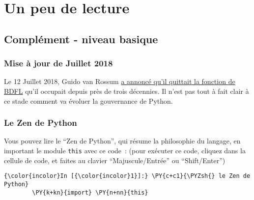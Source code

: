     
    
    
    

    

    \hypertarget{un-peu-de-lecture}{%
\section{Un peu de lecture}\label{un-peu-de-lecture}}

    \hypertarget{compluxe9ment---niveau-basique}{%
\subsection{Complément - niveau
basique}\label{compluxe9ment---niveau-basique}}

    \hypertarget{mise-uxe0-jour-de-juillet-2018}{%
\subsubsection{Mise à jour de Juillet
2018}\label{mise-uxe0-jour-de-juillet-2018}}

    Le 12 Juillet 2018, Guido van Rossum
\href{https://lwn.net/Articles/759654/}{a annoncé qu'il quittait la
fonction de BDFL} qu'il occupait depuis près de trois décennies. Il
n'est pas tout à fait clair à ce stade comment va évoluer la gouvernance
de Python.

    \hypertarget{le-zen-de-python}{%
\subsubsection{Le Zen de Python}\label{le-zen-de-python}}

    Vous pouvez lire le ``Zen de Python'', qui résume la philosophie du
langage, en important le module \texttt{this} avec ce code~: (pour
exécuter ce code, cliquez dans la cellule de code, et faites au clavier
``Majuscule/Entrée'' ou ``Shift/Enter'')

    \begin{Verbatim}[commandchars=\\\{\},frame=single,framerule=0.3mm,rulecolor=\color{cellframecolor}]
{\color{incolor}In [{\color{incolor}1}]:} \PY{c+c1}{\PYZsh{} le Zen de Python}
        \PY{k+kn}{import} \PY{n+nn}{this}
\end{Verbatim}


